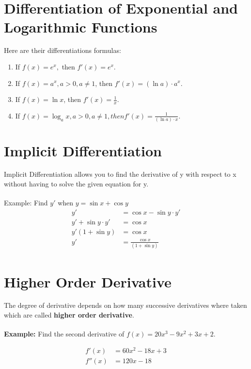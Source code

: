 \section{Differentiation of Exponential and Logarithmic Functions}
Here are their differentiations formulas:\\
\begin{enumerate}
\item If $f(x) = e^x,$ then $f'(x) = e^x$.\\
\item If $f(x) = a^x, a > 0, a \neq 1$, then $f'(x) = (\ln a)\cdot a^x$.\\
\item If $f(x) = \ln x$, then $f'(x) = \frac{1}{x}$.\\
\item If	$f(x) = \log_{a} x, a > 0, a \neq 1, then f'(x) = \frac{1}{(\ln a)\cdot x} $.
\end{enumerate}

\newpage
\section{Implicit Differentiation}
Implicit Differentiation allows you to find the derivative of y with respect to x without having to solve the given equation for y.
\\\\
Example: Find $y'$ when $y = \sin x + \cos y$
\begin{equation*}
  \begin{aligned}
    y' &= \cos x - \sin y \cdot y' \\
    y' + \sin y \cdot y' &= \cos x  \\
    y'(1 + \sin y)    &= \cos x \\
    y' &= \frac{\cos x}{(1 + \sin y)} \\
  \end{aligned}
\end{equation*}

\section{Higher Order Derivative}
The degree of derivative depends on how many successive derivatives where taken which are called \textbf{higher order derivative}.\\
\\
\noindent \textbf{Example:} Find the second derivative of $f(x) = 20x^3 - 9x^2 + 3x + 2$.

\begin{equation*}
  \begin{aligned}
    f'(x)  &= 60x^2 - 18x + 3 \\
    f''(x) &= 120x - 18
  \end{aligned}
\end{equation*}

